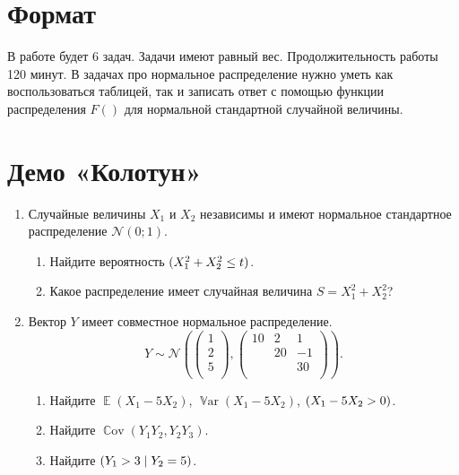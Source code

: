 \documentclass[12pt]{article}
\DeclareMathOperator{\Cov}{\mathbb{C}ov}
\DeclareMathOperator{\Var}{\mathbb{V}ar}
\let\P\relax
\DeclareMathOperator{\P}{\mathbb{P}}
\DeclareMathOperator{\E}{\mathbb{E}}
\newcommand \cN{\mathcal{N}}
\begin{document}
\section*{Формат}

В работе будет 6 задач. 
Задачи имеют равный вес. 
Продолжительность работы 120 минут. 
В задачах про нормальное распределение нужно уметь как воспользоваться таблицей, так и записать ответ с помощью функции распределения $F()$ для нормальной стандартной случайной величины.

\section*{Демо «Колотун»}
\begin{enumerate}
    \item %
    Случайные величины $X_1$ и $X_2$ независимы и имеют нормальное стандартное распределение $\cN(0;1)$.
    \begin{enumerate}
        \item Найдите вероятность $\P(X_1^2 + X_2^2 \leq t)$.
        \item Какое распределение имеет случайная величина $S = X_1^2 + X_2^2$?
    \end{enumerate}
    
    \item Вектор $Y$ имеет совместное нормальное распределение. 
    \[
    Y \sim \cN\left( \begin{pmatrix}
        1 \\
        2 \\
        5 \\
    \end{pmatrix}, 
    \begin{pmatrix}
        10 & 2 & 1 \\
         & 20 & -1 \\
         & & 30 \\
    \end{pmatrix}
    \right).
    \]
\begin{enumerate}
    \item Найдите $\E(X_1 - 5X_2)$, $\Var(X_1 - 5X_2)$, $\P(X_1 - 5X_2 > 0)$.
    \item Найдите $\Cov(Y_1 Y_2, Y_2 Y_3)$.
    \item Найдите $\P(Y_1 > 3 \mid Y_2 = 5)$.
\end{enumerate}    



\end{enumerate}
\end{document}
